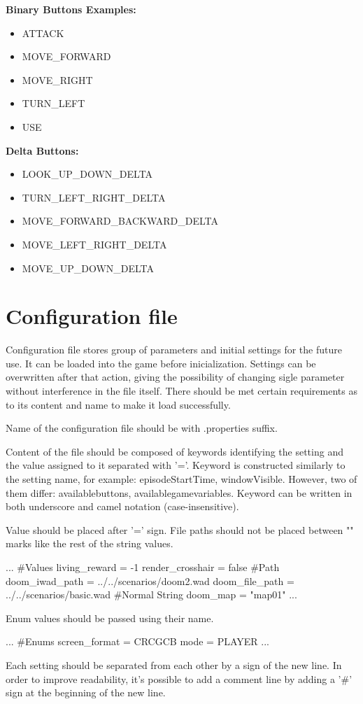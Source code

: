 \vspace{20pt}
\textbf{Binary Buttons Examples:}
\begin{itemize} 
	\item ATTACK
	\item MOVE\_FORWARD
	\item MOVE\_RIGHT
	\item TURN\_LEFT
	\item USE
\end{itemize}

\vspace{20pt}
\textbf{Delta Buttons:}
\begin{itemize} 
	 \item LOOK\_UP\_DOWN\_DELTA
	 \item TURN\_LEFT\_RIGHT\_DELTA
	 \item MOVE\_FORWARD\_BACKWARD\_DELTA
	 \item MOVE\_LEFT\_RIGHT\_DELTA
	 \item MOVE\_UP\_DOWN\_DELTA
\end{itemize}

\section{Configuration file}\label{sec:configuration_file}


Configuration file stores group of parameters and initial settings for the future use. It can be loaded into the game before inicialization. Settings can be overwritten after that action, giving the possibility of changing sigle parameter without interference in the file itself. There should be met certain requirements as to its content and name to make it load successfully.

Name of the configuration file should be with .properties suffix.

Content of the file should be composed of keywords identifying the setting and the value assigned to it separated with '='. Keyword is constructed similarly to the setting name, for example: episodeStartTime, windowVisible. However, two of them differ: availablebuttons, availablegamevariables.
Keyword can be written in both underscore and camel notation (case-insensitive). 


Value should be placed after '=' sign. File paths should not be placed between "" marks like the rest of the string values.
\begin{pblock}
...
#Values
living_reward = -1
render_crosshair = false
#Path
doom_iwad_path = ../../scenarios/doom2.wad
doom_file_path = ../../scenarios/basic.wad
#Normal String
doom_map = "map01"
...
\end{pblock}
Enum values should be passed using their name.
\begin{pblock}
...
#Enums
screen_format = CRCGCB
mode = PLAYER
...
\end{pblock}
Each setting should be separated from each other by a sign of the new line. In order to improve readability, it's possible to add a comment line by adding a '\#' sign at the beginning of the new line.

